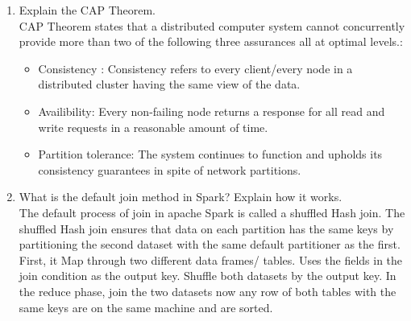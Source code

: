 \documentclass[10pt]{article}
\begin{document}
\begin{enumerate}
		
		
		\item Explain the CAP Theorem.\\
		CAP Theorem states that a distributed computer system cannot concurrently provide more than two of the following three assurances all at optimal levels.:
		
		\begin{itemize}
			\item 	Consistency : Consistency refers to every client/every node in a distributed cluster having the same view of the data.
			
			\item Availibility: Every non-failing node returns a response for all read and write requests in a reasonable amount of time.
			
			\item 	Partition tolerance: The system continues to function and upholds its consistency guarantees in spite of network partitions. 
		\end{itemize}
	
		
		\item What is the default join method in Spark? Explain how it works.\\
		The default process of join in apache Spark is called a shuffled Hash join. The shuffled Hash join ensures that data on each partition has the same keys by partitioning the second dataset with the same default partitioner as the first. First, it Map through two different data frames/ tables. Uses the fields in the join condition as the output key. Shuffle both datasets by the output key. In the reduce phase, join the two datasets now any row of both tables with the same keys are on the same machine and are sorted.
		
		
	\end{enumerate}
	
	
		
\end{document}
